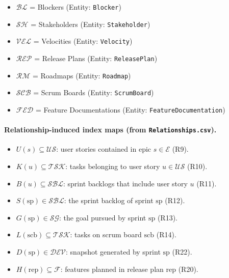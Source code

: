 \documentclass[11pt,a4paper]{article}
\begin{document}
\begin{itemize}[leftmargin=2em]
  \item $\mathcal{BL}$ = Blockers (Entity: \texttt{Blocker})
  \item $\mathcal{SH}$ = Stakeholders (Entity: \texttt{Stakeholder})
  \item $\mathcal{VEL}$ = Velocities (Entity: \texttt{Velocity})
  \item $\mathcal{REP}$ = Release Plans (Entity: \texttt{ReleasePlan})
  \item $\mathcal{RM}$ = Roadmaps (Entity: \texttt{Roadmap})
  \item $\mathcal{SCB}$ = Scrum Boards (Entity: \texttt{ScrumBoard})
  \item $\mathcal{FED}$ = Feature Documentations (Entity: \texttt{FeatureDocumentation})
\end{itemize}

\paragraph{Relationship-induced index maps (from \texttt{Relationships.csv}).}
\begin{itemize}[leftmargin=2em]
  \item $U(s) \subseteq \mathcal{US}$: user stories contained in epic $s \in \mathcal{E}$ (R9).
  \item $K(u) \subseteq \mathcal{TSK}$: tasks belonging to user story $u \in \mathcal{US}$ (R10).
  \item $B(u) \subseteq \mathcal{SBL}$: sprint backlogs that include user story $u$ (R11).
  \item $S(\mathrm{sp}) \in \mathcal{SBL}$: the sprint backlog of sprint $\mathrm{sp}$ (R12).
  \item $G(\mathrm{sp}) \in \mathcal{SG}$: the goal pursued by sprint $\mathrm{sp}$ (R13).
  \item $L(\mathrm{scb}) \subseteq \mathcal{TSK}$: tasks on scrum board $\mathrm{scb}$ (R14).
  \item $D(\mathrm{sp}) \in \mathcal{DEV}$: snapshot generated by sprint $\mathrm{sp}$ (R22).
  \item $H(\mathrm{rep}) \subseteq \mathcal{F}$: features planned in release plan $\mathrm{rep}$ (R20).
\end{itemize}
\end{document}
